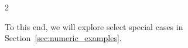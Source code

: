 \documentclass{article}
\newcommand{\M}{\mathcal{M}}                                %
\newcommand{\g}{\mathfrak{g}}                               %
\begin{document}
\begin{multicols}{2}












To this end, we will explore select special cases in Section~\ref{sec:numeric_examples}. %


\end{multicols}
\end{document}
